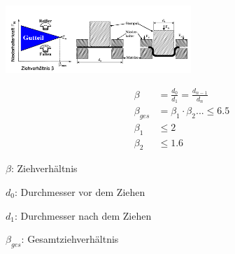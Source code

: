 \includegraphics[width = 70mm]{src/images/Tiefziehen.png}




\begin{minipage}{0.5\linewidth}
    \[
    \boxed{     
        \begin{aligned}
            \beta &=\frac{d_0}{d_1} = \frac{d_{n - 1}}{d_n}\\
            \beta_{ges} &= \beta_1 \cdot \beta_2 ... \leq  6.5\\
            \beta_1 &\leq 2\\
            \beta_2 &\leq 1.6
        \end{aligned}
        }
    \]
\end{minipage}
\begin{minipage}{0.5\linewidth}
    \item $\beta$: Ziehverhältnis
    \item $d_0$: Durchmesser vor dem Ziehen
    \item $d_1$: Durchmesser nach dem Ziehen
    \item $\beta_{ges}$: Gesamtziehverhältnis
\end{minipage}
\vspace{1mm}

